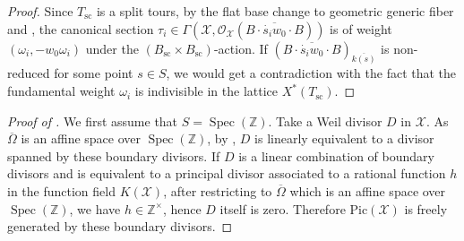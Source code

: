 \documentclass[11pt, reqno]{amsart}
\theoremstyle{plain}
\theoremstyle{definition}
\DeclareMathOperator{\Spec}{Spec}		%
\begin{document}
\begin{proof}
Since $T_{\text{sc}}$ is a split tours, by the flat base change to geometric generic fiber and \cite[Proposition~6.1.11 (ii) (iv)]{BrionKumar}, the canonical section $\tau_i\in \Gamma(\mathcal{X},\mathcal{O}_{\mathcal{X}}(\overline{B\cdot \dot{s_i}w_0 \cdot B}))$ is of weight $(\omega_i, -w_0\omega_i)$ under the $(B_{\text{sc}}\times B_{\text{sc}})$-action. If $(\overline{B\cdot \dot{s_i}w_0 \cdot B})_{\overline{k(s)}}$ is non-reduced for some point $s\in S$, we would get a contradiction with the fact that the fundamental weight $\omega_i$ is indivisible in the lattice $X^*(T_{\text{sc}})$.
\end{proof}


\begin{proof}[Proof of ]
   We first assume that $S=\Spec(\mathbb{Z})$.
   Take a Weil divisor $D$ in $\mathcal{X}$. As $\overline{\Omega}$ is an affine space over $\Spec(\mathbb{Z})$, by \cite[Proposition~11.40]{GortzWedhorn}, $D$ is linearly equivalent to a divisor spanned by these boundary divisors. If $D$ is a linear combination of boundary divisors and is equivalent to a principal divisor associated to a rational function $h$ in the function field $K(\mathcal{X})$, after restricting to $\overline{\Omega}$ which is an affine space over $\Spec(\mathbb{Z})$, we have $h\in\mathbb{Z}^{\times}$, hence $D$ itself is zero. Therefore $\text{Pic}(\mathcal{X})$ is freely generated by these boundary divisors.


\end{proof}
\end{document}
